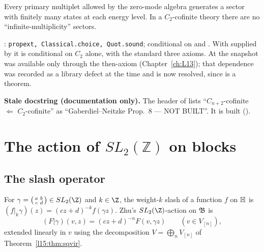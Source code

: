 \begin{physics}
Every primary multiplet allowed by the zero-mode algebra generates a sector with finitely many states at each energy
level. In a $C_2$-cofinite theory there are no ``infinite-multiplicity'' sectors.
\end{physics}

\begin{status}
\allowbreak{}: \texttt{propext, Classical.choice, Quot.sound}; conditional on
 and . With  supplied by  it is conditional on $C_2$ alone, with
the standard three axioms. At the snapshot  was available only through the then-axiom 
(Chapter~\ref{ch:L13}); that dependence was recorded as a library defect at the time and is now resolved, since
 is a theorem.
\end{status}

\begin{warning}
\textbf{Stale docstring (documentation only).} The header of  lists ``$C_{n+2}$-cofinite $\Leftarrow$
$C_2$-cofinite'' as ``Gaberdiel--Neitzke Prop.~8 --- NOT BUILT''. It is built ().
\end{warning}

\section{The action of \texorpdfstring{$SL_2(\mathbb{Z})$}{SL2(Z)} on blocks}\label{l15:sec:slash}

\subsection{The slash operator}

For $\gamma=\left(\begin{smallmatrix}a&b\\c&d\end{smallmatrix}\right)\in\lfifteenSL$ and $k\in\Z$, the weight-$k$ slash of a
function $f$ on $\mathbb{H}$ is $(f|_k\gamma)(z)=(cz+d)^{-k}f(\gamma z)$. Zhu's $\lfifteenSL$-action on $\mathfrak{B}$ is
\begin{equation*}
  (F|\gamma)(v,z)=(cz+d)^{-n}F(v,\gamma z)\qquad (v\in V_{[n]}),
\end{equation*}
extended linearly in $v$ using the decomposition $V=\bigoplus_nV_{[n]}$ of Theorem~\ref{l15:thm:sqvir}.

